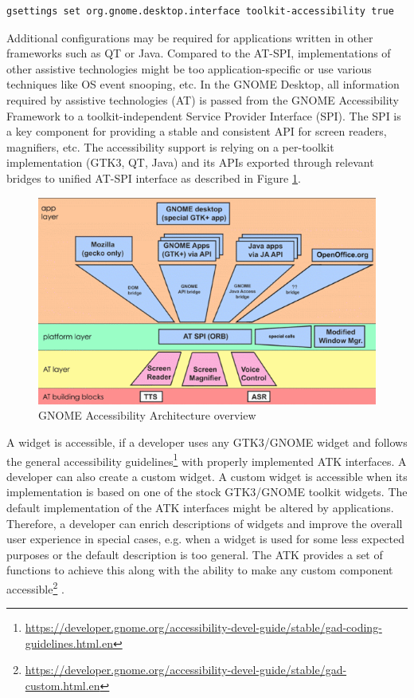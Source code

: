 \begin{lstlisting}[numbers=none,caption={Enabling accessibility via a \texttt{gsettings} command},label={gsettings}]
gsettings set org.gnome.desktop.interface toolkit-accessibility true
\end{lstlisting}

Additional configurations may be required for applications written in other frameworks such as QT or Java. Compared to the AT-SPI, implementations of other assistive technologies might be too application-specific or use various techniques like OS event snooping, etc. In the GNOME Desktop, all information required by assistive technologies (AT) is passed from the GNOME Accessibility Framework to a toolkit-independent Service Provider Interface (SPI). The SPI is a key component for providing a stable and consistent API for screen readers, magnifiers, etc. The accessibility support is relying on a per-toolkit implementation (GTK3, QT, Java) and its APIs exported through relevant bridges to unified AT-SPI interface as described in Figure \ref{ATSPI_architecture}.

\begin{figure}[hbt]
	\centering
	\includegraphics[width=1\textwidth]{obrazky-figures/GNOME_desktop_Accessibility.png}
	\caption{GNOME Accessibility Architecture overview\cite{gnomeADG}}
	\label{ATSPI_architecture}
\end{figure}

A widget is accessible, if a developer uses any GTK3/GNOME widget and follows the general accessibility guidelines\footnote{\url{https://developer.gnome.org/accessibility-devel-guide/stable/gad-coding-guidelines.html.en}} with properly implemented ATK interfaces. A developer can also create a custom widget. A custom widget is accessible when its implementation is based on one of the stock GTK3/GNOME toolkit widgets. The default implementation of the ATK interfaces might be altered by applications. Therefore, a developer can enrich descriptions of widgets and improve the overall user experience in special cases, e.g. when a widget is used for some less expected purposes or the default description is too general. The ATK provides a set of functions to achieve this along with the ability to make any custom component accessible\footnote{\url{https://developer.gnome.org/accessibility-devel-guide/stable/gad-custom.html.en}} \cite{accessibleWidgets}.

